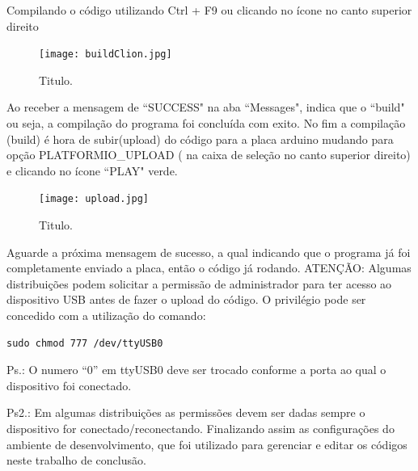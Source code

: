 \documentclass[a4paper,12pt,portuguese]{ufms-cpcx}
\begin{document}
Compilando o código utilizando Ctrl + F9 ou clicando no ícone no canto superior direito
\begin{figure}[H]	
	\centering
	\texttt{[image: buildClion.jpg]}
	\caption{Titulo.}
\end{figure}
Ao receber a mensagem de ``SUCCESS" na aba ``Messages", indica que o ``build" ou seja, a compilação do programa foi concluída com exito.
No fim a compilação (build) é hora de subir(upload) do código para a placa arduino mudando para opção PLATFORMIO\_UPLOAD ( na caixa de seleção no canto superior direito) e clicando no ícone ``PLAY" verde.
\begin{figure}[H]	
	\centering
	\texttt{[image: upload.jpg]}
	\caption{Titulo.}
\end{figure}
Aguarde a próxima mensagem de sucesso, a qual indicando que o programa já foi completamente enviado a placa, então o código já rodando.
ATENÇÃO: Algumas distribuições podem solicitar a permissão de administrador para ter acesso ao dispositivo USB antes de fazer o upload do código. O privilégio pode ser concedido com a utilização do comando:
\begin{lstlisting}
sudo chmod 777 /dev/ttyUSB0
\end{lstlisting}
Ps.: O numero “0” em ttyUSB0 deve ser trocado conforme a porta ao qual o dispositivo foi conectado.

Ps2.: Em algumas distribuições as permissões devem ser dadas sempre o dispositivo for conectado/reconectando.
Finalizando assim as configurações do ambiente de desenvolvimento, que foi utilizado para gerenciar e editar os códigos neste trabalho de conclusão.
\end{document}

